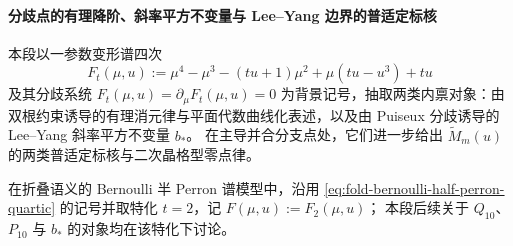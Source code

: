 \paragraph{分歧点的有理降阶、斜率平方不变量与 Lee--Yang 边界的普适定标核}
本段以一参数变形谱四次
\[
F_t(\mu,u):=\mu^4-\mu^3-(tu+1)\mu^2+\mu(tu-u^3)+tu
\]
及其分歧系统
\(
F_t(\mu,u)=\partial_\mu F_t(\mu,u)=0
\)
为背景记号，抽取两类内禀对象：由双根约束诱导的有理消元律与平面代数曲线化表述，以及由 Puiseux 分歧诱导的 Lee--Yang 斜率平方不变量 \(b_\ast\)。
在主导并合分支点处，它们进一步给出 \(\widetilde M_m(u)\) 的两类普适定标核与二次晶格型零点律。
\par
在折叠语义的 Bernoulli 半 Perron 谱模型中，沿用 \eqref{eq:fold-bernoulli-half-perron-quartic} 的记号并取特化 \(t=2\)，记
\(
F(\mu,u):=F_2(\mu,u)
\)；
本段后续关于 \(Q_{10}\)、\(P_{10}\) 与 \(b_\ast\) 的对象均在该特化下讨论。

